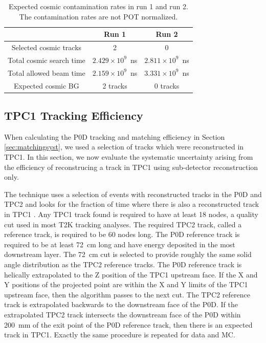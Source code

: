 \begin{table}[h]
\caption{Expected cosmic contamination rates in run 1 and run 2. The contamination rates are not POT normalized.}
\label{tab:cosmiccont}
\centering
\begin{tabular}{ccc}
\toprule
 & Run 1 & Run 2\\
\midrule
Selected cosmic tracks & 2 & 0\\
Total cosmic search time & $2.429\times10^9$~ns & $2.811\times10^9$~ns \\
Total allowed beam time & $2.159\times10^9$~ns & $3.331\times10^9$~ns \\
Expected cosmic BG & 2 tracks & 0 tracks\\
\bottomrule
\end{tabular}
\end{table}

\subsection{TPC1 Tracking Efficiency}
\label{sec:Systematics_TPC1tracking}

When calculating the P0D tracking and matching efficiency in Section \ref{sec:matchingsyst}, we used a selection of tracks which were reconstructed in TPC1. In this section, we now evaluate the systematic uncertainty arising from the efficiency of reconstrucing a track in TPC1 using sub-detector reconstruction only. 

The technique uses a selection of events with reconstructed tracks in the P0D and TPC2 and looks for the fraction of time where there is also a reconstructed track in TPC1 \cite{trkefftn}. Any TPC1 track found is required to have at least 18 nodes, a quality cut used in most T2K tracking analyses. The required TPC2 track, called a reference track, is required to be 60 nodes long. The P0D reference track is required to be at least 72~cm long and have energy deposited in the most downstream layer. The 72~cm cut is selected to provide roughly the same solid angle distribution as the TPC2 reference tracks. The P0D reference track is helically extrapolated to the Z position of the TPC1 upstream face. If the X and Y positions of the projected point are within the X and Y limits of the TPC1 upstream face, then the algorithm passes to the next cut. The TPC2 reference track is extrapolated backwards to the downstream face of the P0D. If the extrapolated TPC2 track intersects the downstream face of the P0D within 200~mm of the exit point of the P0D reference track, then there is an expected track in TPC1. Exactly the same procedure is repeated for data and MC.


